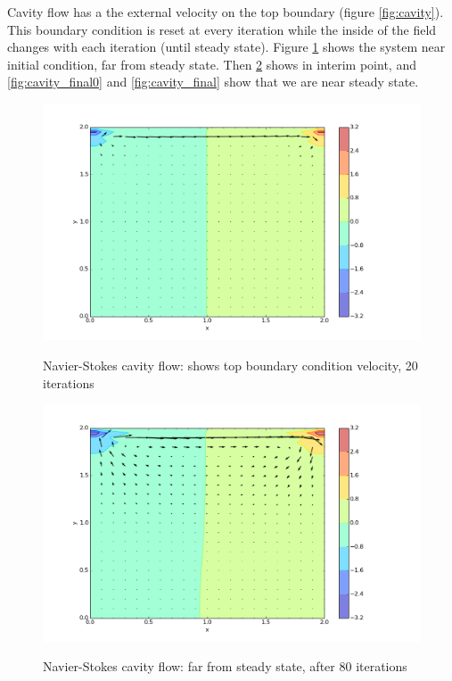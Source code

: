 \documentclass[11pt]{article}
\begin{document}
{Cavity flow has a the external velocity on the top boundary (figure \ref{fig:cavity}).
This boundary condition is reset at every iteration while the inside of the field
changes with each iteration (until steady state). Figure \ref{fig:cavity_0ish} shows
the system near initial condition, far from steady state. Then \ref{fig:cavity_med}
shows in interim point, and \ref{fig:cavity_final0} and \ref{fig:cavity_final} show
that we are near steady state.
	\begin{figure}[H]
	\centering
	\caption{Navier-Stokes cavity flow: shows top boundary condition velocity, 20 iterations}
	\includegraphics[scale=0.57]{cavity_0ish.png}
	\label{fig:cavity_0ish}
	\end{figure}

	\begin{figure}[H]
	\centering
	\caption{Navier-Stokes cavity flow: far from steady state, after 80 iterations}
	\includegraphics[scale=0.57]{cavity_med.png}
	\label{fig:cavity_med}
	\end{figure}

}
\end{document}
